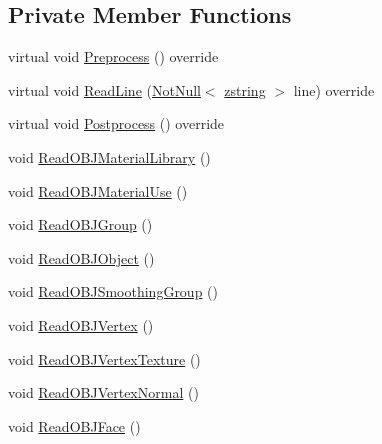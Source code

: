 \subsection*{Private Member Functions}
\begin{DoxyCompactItemize}
\item 
virtual void \hyperlink{classmage_1_1rendering_1_1loader_1_1_o_b_j_reader_ad082a6295259f7e8af2c60c182ea55d3}{Preprocess} () override
\item 
virtual void \hyperlink{classmage_1_1rendering_1_1loader_1_1_o_b_j_reader_a6552753d2295585283df035732f38dbd}{Read\+Line} (\hyperlink{namespacemage_a8769f9d670d6b585ea306cb1062af94b}{Not\+Null}$<$ \hyperlink{namespacemage_a4163ec9a9a27d5e7f4b452dcb99cb2b9}{zstring} $>$ line) override
\item 
virtual void \hyperlink{classmage_1_1rendering_1_1loader_1_1_o_b_j_reader_a281c16ef7d20a7c1416923f3cadee33a}{Postprocess} () override
\item 
void \hyperlink{classmage_1_1rendering_1_1loader_1_1_o_b_j_reader_aa898eb5cac6a5e04b1da9329587a81cd}{Read\+O\+B\+J\+Material\+Library} ()
\item 
void \hyperlink{classmage_1_1rendering_1_1loader_1_1_o_b_j_reader_a5aa719224a08175bcbcb26873e2fb5e1}{Read\+O\+B\+J\+Material\+Use} ()
\item 
void \hyperlink{classmage_1_1rendering_1_1loader_1_1_o_b_j_reader_a4e733a0afea4b82e3aea89fe58f5bfba}{Read\+O\+B\+J\+Group} ()
\item 
void \hyperlink{classmage_1_1rendering_1_1loader_1_1_o_b_j_reader_a519f333ce13777d469c63eae7ab8dcf4}{Read\+O\+B\+J\+Object} ()
\item 
void \hyperlink{classmage_1_1rendering_1_1loader_1_1_o_b_j_reader_ac7f3807cf0a0ae24b340cb8208c5b2ef}{Read\+O\+B\+J\+Smoothing\+Group} ()
\item 
void \hyperlink{classmage_1_1rendering_1_1loader_1_1_o_b_j_reader_a0f6e0d744b2baf94bca4dfda6c2cc194}{Read\+O\+B\+J\+Vertex} ()
\item 
void \hyperlink{classmage_1_1rendering_1_1loader_1_1_o_b_j_reader_a91f53fd761c83c4135a3ef1882b8300d}{Read\+O\+B\+J\+Vertex\+Texture} ()
\item 
void \hyperlink{classmage_1_1rendering_1_1loader_1_1_o_b_j_reader_a1aafeda3894017fb9b3c6183ac272a34}{Read\+O\+B\+J\+Vertex\+Normal} ()
\item 
void \hyperlink{classmage_1_1rendering_1_1loader_1_1_o_b_j_reader_a58d5c4e4a5a82714567413b6e17a9ec7}{Read\+O\+B\+J\+Face} ()
\item 

\end{DoxyCompactItemize}
